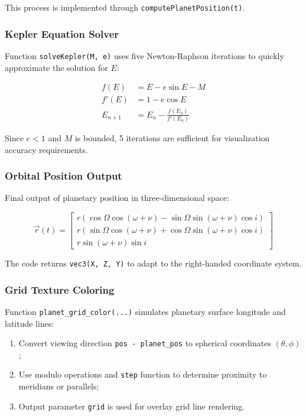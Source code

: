 \documentclass[11pt,a4paper]{article}
\begin{document}
This process is implemented through \texttt{computePlanetPosition(t)}.

\subsubsection{Kepler Equation Solver}

Function \texttt{solveKepler(M, e)} uses five Newton-Raphson iterations to quickly approximate the solution for $E$:

\begin{align}
f(E) &= E - e \sin E - M \\
f'(E) &= 1 - e \cos E \\
E_{n+1} &= E_n - \frac{f(E_n)}{f'(E_n)}
\end{align}

Since $e < 1$ and $M$ is bounded, 5 iterations are sufficient for visualization accuracy requirements.

\subsubsection{Orbital Position Output}

Final output of planetary position in three-dimensional space:

\begin{equation}
\vec{r}(t) =
\begin{bmatrix}
r (\cos \Omega \cos(\omega + \nu) - \sin \Omega \sin(\omega + \nu)\cos i) \\
r (\sin \Omega \cos(\omega + \nu) + \cos \Omega \sin(\omega + \nu)\cos i) \\
r \sin(\omega + \nu) \sin i
\end{bmatrix}
\end{equation}

The code returns \texttt{vec3(X, Z, Y)} to adapt to the right-handed coordinate system.

\subsubsection{Grid Texture Coloring}

Function \texttt{planet\_grid\_color(...)} simulates planetary surface longitude and latitude lines:

\begin{enumerate}
    \item Convert viewing direction \texttt{pos - planet\_pos} to spherical coordinates $(\theta, \phi)$;
    \item Use modulo operations and \texttt{step} function to determine proximity to meridians or parallels;
    \item Output parameter \texttt{grid} is used for overlay grid line rendering.
\end{enumerate}
\end{document}
